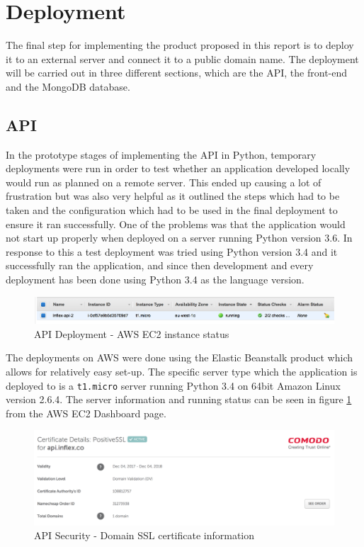 \documentclass[a4paper,12pt]{report}
\begin{document}
  \section{Deployment}
    The final step for implementing the product proposed in this report is to deploy it to an external server and connect it to a public domain name. The deployment will be carried out in three different sections, which are the API, the front-end and the MongoDB database.

    \subsection{API}
      In the prototype stages of implementing the API in Python, temporary deployments were run in order to test whether an application developed locally would run as planned on a remote server. This ended up causing a lot of frustration but was also very helpful as it outlined the steps which had to be taken and the configuration which had to be used in the final deployment to ensure it ran successfully. One of the problems was that the application would not start up properly when deployed on a server running Python version 3.6. In response to this a test deployment was tried using Python version 3.4 and it successfully ran the application, and since then development and every deployment has been done using Python 3.4 as the language version.

      \begin{figure}[h]
        \centering
        \includegraphics[width=\linewidth]{ec2-info}
        \caption{API Deployment - AWS EC2 instance status}
        \label{fig:ec2-info}
      \end{figure}

      The deployments on AWS were done using the Elastic Beanstalk product which allows for relatively easy set-up. The specific server type which the application is deployed to is a \texttt{t1.micro} server running Python 3.4 on 64bit Amazon Linux version 2.6.4. The server information and running status can be seen in figure \ref{fig:ec2-info} from the AWS EC2 Dashboard page.

      \begin{figure}[h]
        \centering
        \includegraphics[width=\linewidth]{api-ssl-cert}
        \caption{API Security - Domain SSL certificate information}
        \label{fig:api-ssl-cert}
      \end{figure}
\end{document}
